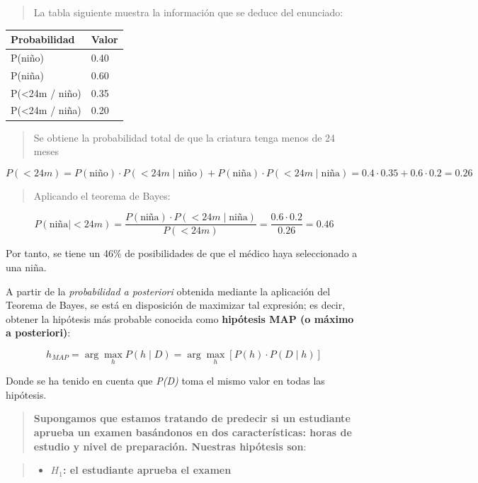 \documentclass[
  a4paper,
  DIV=11,
  numbers=noendperiod]{scrreprt}
\providecommand{\tightlist}{%
  \setlength{\itemsep}{0pt}\setlength{\parskip}{0pt}}\usepackage{longtable,booktabs,array}
\begin{document}
\begin{quote}
La tabla siguiente muestra la información que se deduce del enunciado:
\end{quote}

\begin{longtable}[]{@{}ll@{}}
\toprule\noalign{}
Probabilidad & Valor \\
\midrule\noalign{}
\endhead
\bottomrule\noalign{}
\endlastfoot
P(niño) & 0.40 \\
P(niña) & 0.60 \\
P(\textless24m / niño) & 0.35 \\
P(\textless24m / niña) & 0.20 \\
\end{longtable}

\begin{quote}
Se obtiene la probabilidad total de que la criatura tenga menos de 24
meses
\end{quote}

\[
P(<24m) = P(\text{niño}) \cdot P(<24m \mid \text{niño}) + P(\text{niña}) \cdot P(<24m \mid \text{niña}) = 0.4 \cdot 0.35 + 0.6 \cdot 0.2 = 0.26
\]

\begin{quote}
Aplicando el teorema de Bayes:
\end{quote}

\[
P(\text{niña} \mid <24m) = \frac{P(\text{niña}) \cdot P(<24m \mid \text{niña})}{P(<24m)} = \frac{0.6 \cdot 0.2}{0.26} = 0.46
\]

Por tanto, se tiene un 46\% de posibilidades de que el médico haya
seleccionado a una niña.

A partir de la \emph{probabilidad a posteriori} obtenida mediante la
aplicación del Teorema de Bayes, se está en disposición de maximizar tal
expresión; es decir, obtener la hipótesis más probable conocida como
\textbf{hipótesis MAP (o máximo a posteriori)}:

\[
h_{MAP} = \arg\max_h P(h \mid D) = \arg\max_h [P(h) \cdot P(D \mid h)]
\]

Donde se ha tenido en cuenta que \emph{P(D)} toma el mismo valor en
todas las hipótesis.

\begin{quote}
\textbf{Supongamos que estamos tratando de predecir si un estudiante
aprueba un examen basándonos en dos características: horas de estudio y
nivel de preparación. Nuestras hipótesis son}:
\end{quote}

\begin{quote}
\begin{itemize}
\tightlist
\item
  \(H_1\)\textbf{: el estudiante aprueba el examen}
\end{itemize}
\end{quote}
\end{document}
